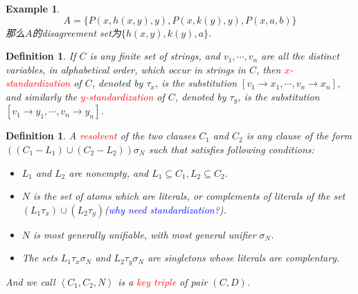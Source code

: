\documentclass{article}
\theoremstyle{plain}
\newtheorem{example}[theorem]{Example}
\newtheorem{definition}[theorem]{Definition}
\theoremstyle{nonumberplain}
\newcommand{\redt}[1]{\textcolor{red}{#1}}
\newcommand{\bluet}[1]{\textcolor{blue}{#1}}
\begin{document}
\begin{example}
\rm 
\[
	A = \{P(x, h(x,y), y), P(x,k(y),y), P(x,a,b)\}
\]
那么$A$的disagreement set为$\{h(x,y), k(y), a\}$. 
\end{example}

\begin{definition}
\rm If $C$ is any finite set of strings, and $v_1, \cdots, v_n$ are all the distinct variables, in alphabetical order, which occur in strings in  $C$, then \redt{$x$-standardization} of $C$, denoted by $\tau_x$, is the substitution $[v_1 \to x_1, \cdots, v_n \to x_n]$, and similarly the \redt{$y$-standardization} of $C$, denoted by $\tau_y$, is the substitution $[v_1 \to y_1, \cdots, v_n \to y_n]$. 
\end{definition}

\begin{definition}\label{resolvent-def}
\rm A \redt{resolvent} of the two clauses $C_1$ and $C_2$ is any clause of the form $((C_1 - L_1) \cup (C_2-L_2))\sigma_N$ such that satisfies following conditions:
\begin{itemize}
	\item $L_1$ and $L_2$ are nonempty, and $L_1 \subseteq C_1, L_2 \subseteq C_2$.
	\item $N$ is the set of atoms which are literals, or complements of literals of the set $(L_1\tau_x) \cup (L_2\tau_y)$(\bluet{why need standardization?}).
	\item $N$ is most generally unifiable, with most general unifier $\sigma_N$.
	\item The sets $L_1\tau_x\sigma_N$ and $L_2\tau_y\sigma_N$ are singletons whose literals are complentary. 
\end{itemize}
And we call $\left<C_1,C_2,N\right>$ is a \redt{key triple} of pair $(C,D)$.
\end{definition}
\end{document}

